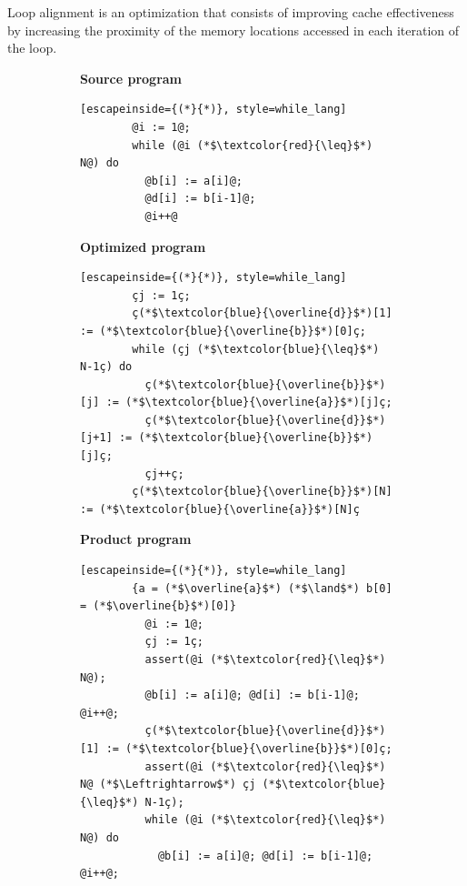 Loop alignment is an optimization that consists of improving cache effectiveness by increasing the proximity of the memory locations accessed in each iteration of the loop.
\begin{figure}
  \centering
  \begin{subfigure}[b]{0.45\textwidth}
    \begin{minipage}[t]{\linewidth}
      \textbf{Source program}
      \begin{lstlisting}[escapeinside={(*}{*)}, style=while_lang]
        @i := 1@; 
        while (@i (*$\textcolor{red}{\leq}$*) N@) do
          @b[i] := a[i]@;
          @d[i] := b[i-1]@;
          @i++@
      \end{lstlisting}
    \end{minipage}
  \end{subfigure}
  \hfill
  \begin{subfigure}[b]{0.45\textwidth}
    \begin{minipage}[t]{\linewidth}
      \textbf{Optimized program}
      \begin{lstlisting}[escapeinside={(*}{*)}, style=while_lang]
        çj := 1ç;
        ç(*$\textcolor{blue}{\overline{d}}$*)[1] := (*$\textcolor{blue}{\overline{b}}$*)[0]ç;
        while (çj (*$\textcolor{blue}{\leq}$*) N-1ç) do
          ç(*$\textcolor{blue}{\overline{b}}$*)[j] := (*$\textcolor{blue}{\overline{a}}$*)[j]ç;
          ç(*$\textcolor{blue}{\overline{d}}$*)[j+1] := (*$\textcolor{blue}{\overline{b}}$*)[j]ç;
          çj++ç;
        ç(*$\textcolor{blue}{\overline{b}}$*)[N] := (*$\textcolor{blue}{\overline{a}}$*)[N]ç
      \end{lstlisting}
    \end{minipage}
  \end{subfigure}
  \hfill
  \begin{subfigure}[b]{0.9\textwidth}
    \begin{minipage}[t]{\linewidth}
      \textbf{Product program}
      \begin{lstlisting}[escapeinside={(*}{*)}, style=while_lang]
        {a = (*$\overline{a}$*) (*$\land$*) b[0] = (*$\overline{b}$*)[0]}
          @i := 1@; 
          çj := 1ç;
          assert(@i (*$\textcolor{red}{\leq}$*) N@);
          @b[i] := a[i]@; @d[i] := b[i-1]@; @i++@;
          ç(*$\textcolor{blue}{\overline{d}}$*)[1] := (*$\textcolor{blue}{\overline{b}}$*)[0]ç;
          assert(@i (*$\textcolor{red}{\leq}$*) N@ (*$\Leftrightarrow$*) çj (*$\textcolor{blue}{\leq}$*) N-1ç);
          while (@i (*$\textcolor{red}{\leq}$*) N@) do
            @b[i] := a[i]@; @d[i] := b[i-1]@; @i++@;

\end{lstlisting}
\end{minipage}
\end{subfigure}
\end{figure}
